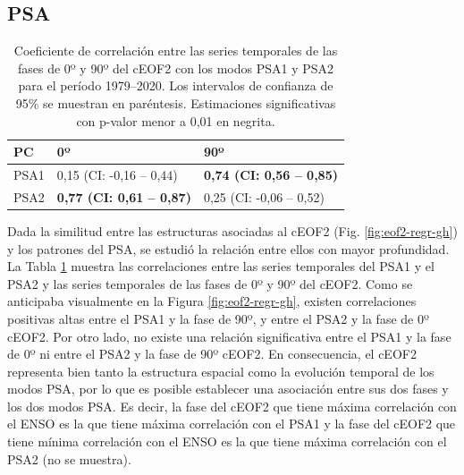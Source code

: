 \documentclass[12pt,oneside,a4paper]{reedthesis}
\begin{document}
\hypertarget{psa}{%
\subsection{PSA}\label{psa}}



\begin{table}

\caption{\label{tab:psa-eof2}Coeficiente de correlación entre las series temporales de las fases de 0º y 90º del cEOF2 con los modos PSA1 y PSA2 para el período 1979--2020. Los intervalos de confianza de 95\% se muestran en paréntesis. Estimaciones significativas con p-valor menor a 0,01 en negrita.}
\centering
\begin{tabular}[t]{l>{}l>{}l}
\toprule
PC & 0º & 90º\\
\midrule
PSA1 & 0,15 (CI: -0,16 -- 0,44) & \textbf{0,74 (CI: 0,56 -- 0,85)}\\
\cmidrule{1-3}
PSA2 & \textbf{0,77 (CI: 0,61 -- 0,87)} & 0,25 (CI: -0,06 -- 0,52)\\
\bottomrule
\end{tabular}
\end{table}

Dada la similitud entre las estructuras asociadas al cEOF2 (Fig. \ref{fig:eof2-regr-gh}) y los patrones del PSA, se estudió la relación entre ellos con mayor profundidad.
La Tabla \ref{tab:psa-eof2} muestra las correlaciones entre las series temporales del PSA1 y el PSA2 y las series temporales de las fases de 0º y 90º del cEOF2.
Como se anticipaba visualmente en la Figura \ref{fig:eof2-regr-gh}, existen correlaciones positivas altas entre el PSA1 y la fase de 90º, y entre el PSA2 y la fase de 0º cEOF2.
Por otro lado, no existe una relación significativa entre el PSA1 y la fase de 0º ni entre el PSA2 y la fase de 90º cEOF2.
En consecuencia, el cEOF2 representa bien tanto la estructura espacial como la evolución temporal de los modos PSA, por lo que es posible establecer una asociación entre sus dos fases y los dos modos PSA.
Es decir, la fase del cEOF2 que tiene máxima correlación con el ENSO es la que tiene máxima correlación con el PSA1 y la fase del cEOF2 que tiene mínima correlación con el ENSO es la que tiene máxima correlación con el PSA2 (no se muestra).
\end{document}
